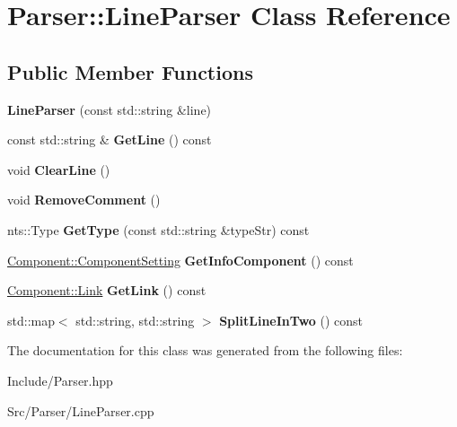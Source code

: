 \hypertarget{classParser_1_1LineParser}{}\section{Parser\+:\+:Line\+Parser Class Reference}
\label{classParser_1_1LineParser}
\subsection*{Public Member Functions}
\begin{DoxyCompactItemize}
\item 
\mbox{\label{classParser_1_1LineParser_aad39093a5159f39ba24e7e2afc545b4e}} 
{\bfseries Line\+Parser} (const std\+::string \&line)
\item 
\mbox{\label{classParser_1_1LineParser_af4f166941b0542889a9d74fbaf45026e}} 
const std\+::string \& {\bfseries Get\+Line} () const
\item 
\mbox{\label{classParser_1_1LineParser_aa84201ccd9d42805185b6e522fed5e34}} 
void {\bfseries Clear\+Line} ()
\item 
\mbox{\label{classParser_1_1LineParser_a8d81c69e2fecbbecf10cba4b08611444}} 
void {\bfseries Remove\+Comment} ()
\item 
\mbox{\label{classParser_1_1LineParser_aeaa42d570c8d05637f35e8c3fc73cae0}} 
nts\+::\+Type {\bfseries Get\+Type} (const std\+::string \&type\+Str) const
\item 
\mbox{\label{classParser_1_1LineParser_a8e6b1842ab6c3279301f92689f103a82}} 
\mbox{\hyperlink{structComponent_1_1ComponentSetting}{Component\+::\+Component\+Setting}} {\bfseries Get\+Info\+Component} () const
\item 
\mbox{\label{classParser_1_1LineParser_a22403bad1a0cda0e45b9cd44bab7d52c}} 
\mbox{\hyperlink{structComponent_1_1Link}{Component\+::\+Link}} {\bfseries Get\+Link} () const
\item 
\mbox{\label{classParser_1_1LineParser_a65ac673bada1929cf2839d787ee36353}} 
std\+::map$<$ std\+::string, std\+::string $>$ {\bfseries Split\+Line\+In\+Two} () const
\end{DoxyCompactItemize}


The documentation for this class was generated from the following files\+:\begin{DoxyCompactItemize}
\item 
Include/Parser.\+hpp\item 
Src/\+Parser/Line\+Parser.\+cpp\end{DoxyCompactItemize}
